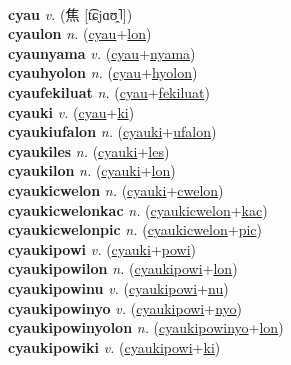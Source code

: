  \label{cyenfut} \\
\textbf{cyau} \textit{v.} ({\chinese{}焦} [t͡ɕjɑʊ̯˥])
 \label{cyau} \\
\textbf{cyaulon} \textit{n.} (\hyperref[cyau]{cyau}+\hyperref[lon]{lon})
 \label{cyaulon} \\
\textbf{cyaunyama} \textit{v.} (\hyperref[cyau]{cyau}+\hyperref[nyama]{nyama})
 \label{cyaunyama} \\
\textbf{cyauhyolon} \textit{n.} (\hyperref[cyau]{cyau}+\hyperref[hyolon]{hyolon})
 \label{cyauhyolon} \\
\textbf{cyaufekiluat} \textit{n.} (\hyperref[cyau]{cyau}+\hyperref[fekiluat]{fekiluat})
 \label{cyaufekiluat} \\
\textbf{cyauki} \textit{v.} (\hyperref[cyau]{cyau}+\hyperref[ki]{ki})
 \label{cyauki} \\
\textbf{cyaukiufalon} \textit{n.} (\hyperref[cyauki]{cyauki}+\hyperref[ufalon]{ufalon})
 \label{cyaukiufalon} \\
\textbf{cyaukiles} \textit{n.} (\hyperref[cyauki]{cyauki}+\hyperref[les]{les})
 \label{cyaukiles} \\
\textbf{cyaukilon} \textit{n.} (\hyperref[cyauki]{cyauki}+\hyperref[lon]{lon})
 \label{cyaukilon} \\
\textbf{cyaukicwelon} \textit{n.} (\hyperref[cyauki]{cyauki}+\hyperref[cwelon]{cwelon})
 \label{cyaukicwelon} \\
\textbf{cyaukicwelonkac} \textit{n.} (\hyperref[cyaukicwelon]{cyaukicwelon}+\hyperref[kac]{kac})
 \label{cyaukicwelonkac} \\
\textbf{cyaukicwelonpic} \textit{n.} (\hyperref[cyaukicwelon]{cyaukicwelon}+\hyperref[pic]{pic})
 \label{cyaukicwelonpic} \\
\textbf{cyaukipowi} \textit{v.} (\hyperref[cyauki]{cyauki}+\hyperref[powi]{powi})
 \label{cyaukipowi} \\
\textbf{cyaukipowilon} \textit{n.} (\hyperref[cyaukipowi]{cyaukipowi}+\hyperref[lon]{lon})
 \label{cyaukipowilon} \\
\textbf{cyaukipowinu} \textit{v.} (\hyperref[cyaukipowi]{cyaukipowi}+\hyperref[nu]{nu})
 \label{cyaukipowinu} \\
\textbf{cyaukipowinyo} \textit{v.} (\hyperref[cyaukipowi]{cyaukipowi}+\hyperref[nyo]{nyo})
 \label{cyaukipowinyo} \\
\textbf{cyaukipowinyolon} \textit{n.} (\hyperref[cyaukipowinyo]{cyaukipowinyo}+\hyperref[lon]{lon})
 \label{cyaukipowinyolon} \\
\textbf{cyaukipowiki} \textit{v.} (\hyperref[cyaukipowi]{cyaukipowi}+\hyperref[ki]{ki})
